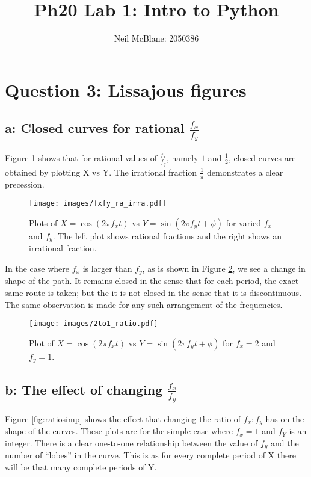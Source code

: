 \documentclass{article}
\begin{document}
\title{Ph20 Lab 1: Intro to Python}
\author{Neil McBlane: 2050386}

\maketitle

\section*{Question 3: Lissajous figures}
\subsection*{a: Closed curves for rational $\frac{f_x}{f_y}$}

Figure \ref{fig:closed} shows that for rational values of $\frac{f_x}{f_y}$, namely $1$ and $\frac{1}{2}$, closed curves are obtained by plotting X vs Y. The irrational fraction $\frac{1}{\pi}$ demonstrates a clear precession.

\begin{figure}[h]
\centering
\texttt{[image: images/fxfy\_ra\_irra.pdf]}
\caption{Plots of $X = \cos(2\pi f_x t)$ vs $Y = \sin(2\pi f_y t + \phi)$ for varied $f_x$ and $f_y$. The left plot shows rational fractions and the right shows an irrational fraction.}
\label{fig:closed}
\end{figure}

In the case where $f_x$ is larger than $f_y$, as is shown in Figure \ref{fig:side}, we see a change in shape of the path. It remains closed in the sense that for each period, the exact same route is taken; but the it is not closed in the sense that it is discontinuous. The same observation is made for any such arrangement of the frequencies.

\begin{figure}[h]
\centering
\texttt{[image: images/2to1\_ratio.pdf]}
\caption{Plot of $X = \cos(2\pi f_x t)$ vs $Y = \sin(2\pi f_y t + \phi)$ for $f_x=2$ and $f_y=1$.}
\label{fig:side}
\end{figure}

\clearpage

\subsection*{b: The effect of changing $\frac{f_x}{f_y}$}
Figure \ref{fig:ratiosimp} shows the effect that changing the ratio of $f_x:f_y$ has on the shape of the curves. These plots are for the simple case where $f_x=1$ and $f_Y$ is an integer. There is a clear one-to-one relationship between the value of $f_y$ and the number of ``lobes'' in the curve. This is as for every complete period of X there will be that many complete periods of Y.
\end{document}
